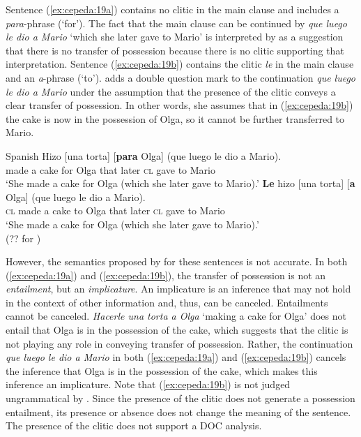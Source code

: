 \documentclass[output=paper,colorlinks,citecolor=brown,nonflat]{./langscibook}
\begin{document}
Sentence (\ref{ex:cepeda:19a}) contains no clitic in the main clause and includes a \textit{para}-phrase (‘for’). The fact that the main clause can be continued by \textit{que luego le dio a Mario} ‘which she later gave to Mario’ is interpreted by \citeauthor{Demonte1995} as a suggestion that there is no transfer of possession because there is no clitic supporting that interpretation. Sentence (\ref{ex:cepeda:19b}) contains the clitic \textit{le} in the main clause and an \textit{a}-phrase (‘to’). \citeauthor{Demonte1995} adds a double question mark to the continuation \textit{que luego le dio a Mario} under the assumption that the presence of the clitic conveys a clear transfer of possession. In other words, she assumes that in (\ref{ex:cepeda:19b}) the cake is now in the possession of Olga, so it cannot be further transferred to Mario.

\ea%
    \label{ex:cepeda:19} 
    Spanish
	\ea\label{ex:cepeda:19a}
	\gll Hizo [una torta] [\textbf{para} Olga] (que luego le   dio   a  Mario).\\
		made \hspaceThis{[}a cake \hspaceThis{[}for Olga that  later \textsc{cl} gave to Mario\\
	\glt ‘She made a cake for Olga (which she later gave to Mario).’
	\ex\label{ex:cepeda:19b}
	\gll  \textbf{Le}  hizo [una torta] [\textbf{a}  Olga] (que luego le  dio    a  Mario).\\
		\textsc{cl} made \hspaceThis{[}a cake \hspaceThis{[}to Olga that  later \textsc{cl} gave to Mario\\
	\glt ‘She made a cake for Olga (which she later gave to Mario).’\\
			(?? for \citeauthor{Demonte1995})
	\z
\z

However, the semantics proposed by \citeauthor{Demonte1995} for these sentences is not accurate. In both (\ref{ex:cepeda:19a}) and (\ref{ex:cepeda:19b}), the transfer of possession is not an \textit{entailment}, but an \textit{implicature}. An implicature is an inference that may not hold in the context of other information and, thus, can be canceled. Entailments cannot be canceled. \textit{Hacerle una torta a Olga} ‘making a cake for Olga’ does not entail that Olga is in the possession of the cake, which suggests that the clitic is not playing any role in conveying transfer of possession. Rather, the continuation \textit{que luego le dio a Mario} in both (\ref{ex:cepeda:19a}) and (\ref{ex:cepeda:19b}) cancels the inference that Olga is in the possession of the cake, which makes this inference an implicature. Note that (\ref{ex:cepeda:19b}) is not judged ungrammatical by \citeauthor{Demonte1995}. Since the presence of the clitic does not generate a possession entailment, its presence or absence does not change the meaning of the sentence. The presence of the clitic does not support a DOC analysis.
\end{document}
